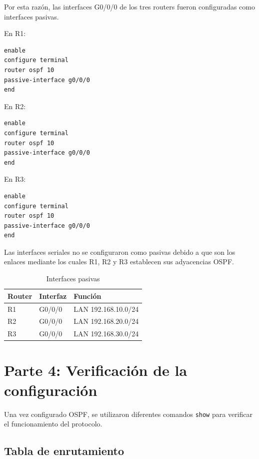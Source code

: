 \documentclass[12pt,a4paper]{article}
\begin{document}
Por esta razón, las interfaces G0/0/0 de los tres routers fueron
configuradas como interfaces pasivas.

En R1:

\begin{lstlisting}[style=cisco]
enable
configure terminal
router ospf 10
passive-interface g0/0/0
end
\end{lstlisting}

En R2:

\begin{lstlisting}[style=cisco]
enable
configure terminal
router ospf 10
passive-interface g0/0/0
end
\end{lstlisting}

En R3:

\begin{lstlisting}[style=cisco]
enable
configure terminal
router ospf 10
passive-interface g0/0/0
end
\end{lstlisting}

Las interfaces seriales no se configuraron como pasivas debido a que
son los enlaces mediante los cuales R1, R2 y R3 establecen sus
adyacencias OSPF.

\begin{table}[H]
\centering
\caption{Interfaces pasivas}
\begin{tabular}{lll}
\toprule
\textbf{Router} & \textbf{Interfaz} & \textbf{Función} \\
\midrule
R1 & G0/0/0 & LAN 192.168.10.0/24 \\
R2 & G0/0/0 & LAN 192.168.20.0/24 \\
R3 & G0/0/0 & LAN 192.168.30.0/24 \\
\bottomrule
\end{tabular}
\end{table}

\section{Parte 4: Verificación de la configuración}

Una vez configurado OSPF, se utilizaron diferentes comandos
\texttt{show} para verificar el funcionamiento del protocolo.

\subsection{Tabla de enrutamiento}
\end{document}
